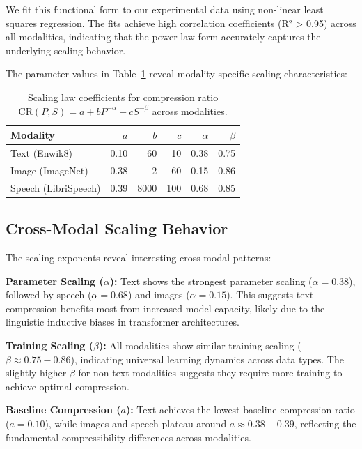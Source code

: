 \documentclass[11pt]{article}
\begin{document}
We fit this functional form to our experimental data using non-linear least squares regression. The fits achieve high correlation coefficients (R² > 0.95) across all modalities, indicating that the power-law form accurately captures the underlying scaling behavior.

The parameter values in Table~\ref{tab:scaling_coefficients} reveal modality-specific scaling characteristics:

\begin{table}[h]
\centering
\begin{tabular}{l r r r r r}
\toprule
Modality & $a$ & $b$ & $c$ & $\alpha$ & $\beta$ \\
\midrule
Text (Enwik8) & 0.10 & 60 & 10 & 0.38 & 0.75 \\
Image (ImageNet) & 0.38 & 2 & 60 & 0.15 & 0.86 \\
Speech (LibriSpeech) & 0.39 & 8000 & 100 & 0.68 & 0.85 \\
\bottomrule
\end{tabular}
\caption{Scaling law coefficients for compression ratio $\mathrm{CR}(P,S) = a + bP^{-\alpha} + cS^{-\beta}$ across modalities.}
\label{tab:scaling_coefficients}
\end{table}

\subsection{Cross-Modal Scaling Behavior}

The scaling exponents reveal interesting cross-modal patterns:

\textbf{Parameter Scaling ($\alpha$):} Text shows the strongest parameter scaling ($\alpha = 0.38$), followed by speech ($\alpha = 0.68$) and images ($\alpha = 0.15$). This suggests text compression benefits most from increased model capacity, likely due to the linguistic inductive biases in transformer architectures.

\textbf{Training Scaling ($\beta$):} All modalities show similar training scaling ($\beta \approx 0.75-0.86$), indicating universal learning dynamics across data types. The slightly higher $\beta$ for non-text modalities suggests they require more training to achieve optimal compression.

\textbf{Baseline Compression ($a$):} Text achieves the lowest baseline compression ratio ($a = 0.10$), while images and speech plateau around $a \approx 0.38-0.39$, reflecting the fundamental compressibility differences across modalities.
\end{document}
